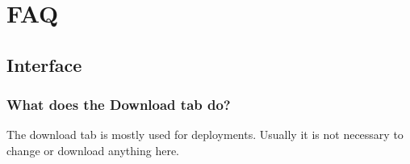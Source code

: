 \documentclass[accentcolor=tud1a, paper=a4, colorback]{tudreport}
\begin{document}
	\chapter{FAQ}
	\section{Interface}
	\subsection{What does the Download tab do?}
	The download tab is mostly used for deployments. Usually it is not necessary to change or
	download anything here.

	\clearpage
	\printindex
\end{document}
